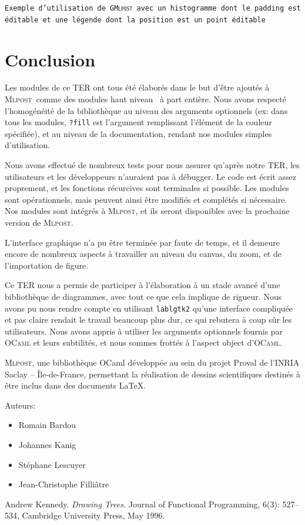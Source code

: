\documentclass[a4paper,12pt]{article}
\newcommand{\mlpost}{\textsc{Mlpost}}
\newcommand{\gmlpost}{\textsc{GMlpost}}
\begin{document}
\begin{center}
\texttt{Exemple d'utilisation de \gmlpost\ avec un histogramme dont le padding est éditable et une légende dont la position est un point éditable } 
\end{center}

\section{Conclusion}
Les modules de ce TER ont tous été élaborés dans le but d'être ajoutés à \mlpost\ comme des modules \og haut niveau \fg\ à part entière. Nous avons respecté l'homogénéité de la bibliothèque au niveau des arguments optionnels (ex: dans tous les modules, \texttt{?fill} est l'argument remplissant l'élément de la couleur spécifiée), et au niveau de la documentation, rendant nos modules simples d'utilisation.

Nous avons effectué de nombreux tests pour nous assurer qu'après notre TER, les utilisateurs et les développeurs n'auraient pas à débugger. Le code est écrit assez proprement, et les fonctions récurcives sont terminales si possible.
Les modules sont opérationnels, mais peuvent ainsi être modifiés et complétés si nécessaire. Nos modules sont intégrés à \mlpost, et ils seront disponibles avec la prochaine version de \mlpost.

L'interface graphique n'a pu être terminée par faute de temps, et il demeure encore de nombreux aspects à travailler au niveau du canvas, du zoom, et de l'importation de figure.

Ce TER nous a permis de participer à l'élaboration à un stade avancé d'une bibliothèque de diagrammes, avec tout ce que cela implique de rigueur. Nous avons pu nous rendre compte en utilisant \texttt{lablgtk2} qu'une interface compliquée et pas claire rendait le travail beaucoup plus dur, ce qui rebutera à coup sûr les utilisateurs. Nous avons appris à utiliser les arguments optionnels fournis par \textsc{OCaml} et leurs subtilités, et nous sommes frottés à l'aspect object d'\textsc{OCaml}.

\begin{thebibliography}{99}
 \mlpost, une bibliothèque OCaml développée au sein du projet Proval de l’INRIA Saclay – Île-de-France, permettant la réalisation de dessins scientifiques destinés à être inclus dans des documents \LaTeX.

Auteurs:
\begin{itemize}
    \item Romain Bardou
    \item Johannes Kanig
    \item Stéphane Lescuyer
    \item Jean-Christophe Filliâtre 
\end{itemize}

Andrew Kennedy. 
\emph{Drawing Trees.}
Journal of Functional Programming, 
6(3): 527--534, Cambridge University Press, May 1996.
\end{thebibliography}
\end{document}
